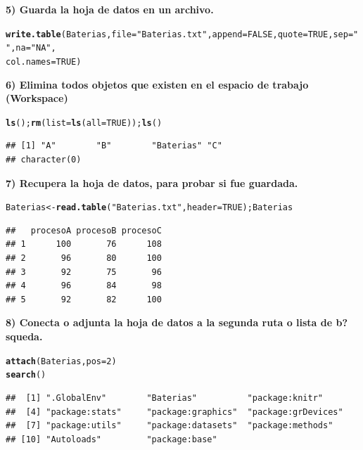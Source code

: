 \documentclass[12pt,letterpaper]{article}\usepackage[]{graphicx}\usepackage[]{color}
\makeatletter
\newcommand{\hlnum}[1]{\textcolor[rgb]{0.686,0.059,0.569}{#1}}%
\newcommand{\hlstr}[1]{\textcolor[rgb]{0.192,0.494,0.8}{#1}}%
\newcommand{\hlstd}[1]{\textcolor[rgb]{0.345,0.345,0.345}{#1}}%
\newcommand{\hlkwb}[1]{\textcolor[rgb]{0.69,0.353,0.396}{#1}}%
\newcommand{\hlkwc}[1]{\textcolor[rgb]{0.333,0.667,0.333}{#1}}%
\newcommand{\hlkwd}[1]{\textcolor[rgb]{0.737,0.353,0.396}{\textbf{#1}}}%
\newenvironment{kframe}{%
 \def\at@end@of@kframe{}%
 \ifinner\ifhmode%
  \def\at@end@of@kframe{\end{minipage}}%
  \begin{minipage}{\columnwidth}%
 \fi\fi%
 \def\FrameCommand##1{\hskip\@totalleftmargin \hskip-\fboxsep
 \colorbox{shadecolor}{##1}\hskip-\fboxsep
     \hskip-\linewidth \hskip-\@totalleftmargin \hskip\columnwidth}%
 \MakeFramed {\advance\hsize-\width
   \@totalleftmargin\z@ \linewidth\hsize
   \@setminipage}}%
 {\par\unskip\endMakeFramed%
 \at@end@of@kframe}
\newenvironment{knitrout}{}{} %
\makeatother
\begin{document}
\textbf{5) Guarda la hoja de datos en un archivo.}
\begin{knitrout}
\color{fgcolor}\begin{kframe}
\begin{alltt}
\hlkwd{write.table}\hlstd{(Baterias,} \hlkwc{file}\hlstd{=}\hlstr{"Baterias.txt"}\hlstd{,} \hlkwc{append}\hlstd{=}\hlnum{FALSE}\hlstd{,} \hlkwc{quote}\hlstd{=}\hlnum{TRUE}\hlstd{,} \hlkwc{sep}\hlstd{=}\hlstr{" "}\hlstd{,} \hlkwc{na}\hlstd{=}\hlstr{"NA"}\hlstd{,}
\hlkwc{col.names}\hlstd{=}\hlnum{TRUE}\hlstd{)}
\end{alltt}
\end{kframe}
\end{knitrout}
\textbf{6) Elimina todos objetos que existen en el espacio de trabajo (Workspace)}
\begin{knitrout}
\color{fgcolor}\begin{kframe}
\begin{alltt}
\hlkwd{ls}\hlstd{();} \hlkwd{rm}\hlstd{(}\hlkwc{list}\hlstd{=}\hlkwd{ls}\hlstd{(}\hlkwc{all}\hlstd{=}\hlnum{TRUE}\hlstd{));} \hlkwd{ls}\hlstd{()}
\end{alltt}
\begin{verbatim}
## [1] "A"        "B"        "Baterias" "C"
## character(0)
\end{verbatim}
\end{kframe}
\end{knitrout}
\textbf{7) Recupera la hoja de datos, para probar si fue guardada.} 
\begin{knitrout}
\color{fgcolor}\begin{kframe}
\begin{alltt}
\hlstd{Baterias} \hlkwb{<-} \hlkwd{read.table}\hlstd{(}\hlstr{"Baterias.txt"}\hlstd{,} \hlkwc{header}\hlstd{=}\hlnum{TRUE}\hlstd{); Baterias}
\end{alltt}
\begin{verbatim}
##   procesoA procesoB procesoC
## 1      100       76      108
## 2       96       80      100
## 3       92       75       96
## 4       96       84       98
## 5       92       82      100
\end{verbatim}
\end{kframe}
\end{knitrout}
\textbf{8) Conecta o adjunta la hoja de datos a la segunda ruta o lista de b?squeda.} 
\begin{knitrout}
\color{fgcolor}\begin{kframe}
\begin{alltt}
\hlkwd{attach}\hlstd{(Baterias,} \hlkwc{pos}\hlstd{=}\hlnum{2}\hlstd{)}
\hlkwd{search}\hlstd{()}
\end{alltt}
\begin{verbatim}
##  [1] ".GlobalEnv"        "Baterias"          "package:knitr"    
##  [4] "package:stats"     "package:graphics"  "package:grDevices"
##  [7] "package:utils"     "package:datasets"  "package:methods"  
## [10] "Autoloads"         "package:base"
\end{verbatim}
\end{kframe}
\end{knitrout}
\end{document}
